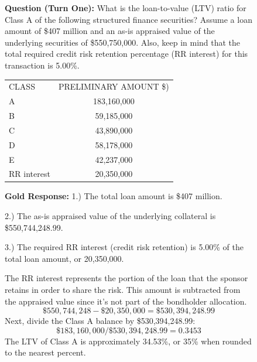\begin{figure}[ht!]
\centering
\small

\begin{tcolorbox}[
    boxsep=1pt, left=2pt,right=2pt,top=2pt,bottom=2pt,
    colback=blue!5!white, colframe=blue!40!black,
    before skip=2pt, after skip=2pt, sharp corners
]
\textbf{Question (Turn One):}  
What is the loan-to-value (LTV) ratio for Class A of the following structured finance securities? Assume a loan amount of \$407 million and an as-is appraised value of the underlying securities of \$550,750,000. Also, keep in mind that the total required credit risk retention percentage (RR interest) for this transaction is 5.00\%.


\begin{tabular}{lc}

CLASS & PRELIMINARY AMOUNT \$) \\
A & 183,160,000 \\
B & 59,185,000 \\
C & 43,890,000 \\
D & 58,178,000 \\
E & 42,237,000 \\
RR interest & 20,350,000 \\

\end{tabular}
\end{tcolorbox}

\begin{tcolorbox}[
    boxsep=1pt, left=2pt,right=2pt,top=2pt,bottom=2pt,
    colback=green!2!white, colframe=green!25!black,
    before skip=1pt, after skip=3pt, sharp corners
]
\small
\textbf{Gold Response:}
1.) The total loan amount is \$407 million.

2.) The as-is appraised value of the underlying collateral is \$550,744,248.99.

3.) The required RR interest (credit risk retention) is 5.00\% of the total loan amount, or 20,350,000. 



The RR interest represents the portion of the loan that the sponsor retains in order to share the risk. This amount is subtracted from the appraised value since it's not part of the bondholder allocation.
\[
\$550,744,248 - \$20,350,000 =  \$530,394,248.99        
\]
Next, divide the Class A balance by \$530,394,248.99: 
\[
\$183,160,000 / \$530,394,248.99 = 0.3453
\]
The LTV of Class A is approximately 34.53\%, or 35\% when rounded to the nearest percent.
\end{tcolorbox}


\end{figure}
